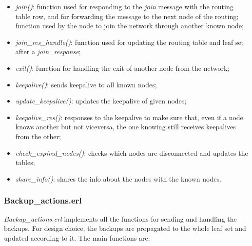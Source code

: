 \documentclass{article}
\begin{document}
\begin{itemize}
    \item \textit{join()}: function used for responding to the \textit{join} message with the routing table row, 
    and for forwarding the message to the next node of the routing; function used by the node to join the network through another known node;
    \item \textit{join\_res\_handle()}: function used for updating the routing table and leaf set after a \textit{join\_response};
    \item \textit{exit()}: function for handling the exit of another node from the network;
    \item \textit{keepalive()}: sends keepalive to all known nodes;
    \item \textit{update\_keepalive()}: updates the keepalive of given nodes;
    \item \textit{keepalive\_res()}: responses to the keepalive to make sure that, even if a node knows another but not viceversa, 
    the one knowing still receives keepalives from the other;
    \item \textit{check\_expired\_nodes()}: checks which nodes are disconnected and updates the tables;
    \item \textit{share\_info()}: shares the info about the nodes with the known nodes.
\end{itemize}

\subsubsection{Backup\_actions.erl}

\textit{Backup\_actions.erl} implements all the functions for sending and handling the backups.
For design choice, the backups are propagated to the whole leaf set and updated according to it.
The main functions are:
\end{document}
